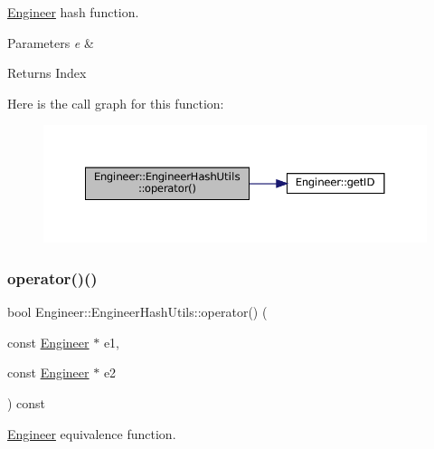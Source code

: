 \mbox{\hyperlink{classEngineer}{Engineer}} hash function.


\begin{DoxyParams}{Parameters}
{\em e} & \\
\hline
\end{DoxyParams}
\begin{DoxyReturn}{Returns}
Index 
\end{DoxyReturn}
Here is the call graph for this function\+:
\nopagebreak
\begin{figure}[H]
\begin{center}
\leavevmode
\includegraphics[width=350pt]{structEngineer_1_1EngineerHashUtils_aa6e83d6d97278db4aad2f07a2cd42cb4_cgraph}
\end{center}
\end{figure}
\mbox{\label{structEngineer_1_1EngineerHashUtils_a4af5919a2a9ff2efd3ae3ec9171919d0}} 
\subsubsection{\texorpdfstring{operator()()}{operator()()}\hspace{0.1cm}{\footnotesize\ttfamily [2/2]}}
{\footnotesize\ttfamily bool Engineer\+::\+Engineer\+Hash\+Utils\+::operator() (\begin{DoxyParamCaption}\item[{const \mbox{\hyperlink{classEngineer}{Engineer}} $\ast$}]{e1,  }\item[{const \mbox{\hyperlink{classEngineer}{Engineer}} $\ast$}]{e2 }\end{DoxyParamCaption}) const\hspace{0.3cm}{\ttfamily [inline]}}

\mbox{\hyperlink{classEngineer}{Engineer}} equivalence function.


